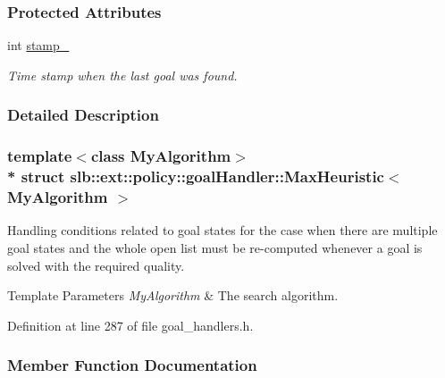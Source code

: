 \subsubsection*{Protected Attributes}
\begin{DoxyCompactItemize}
\item 
int \hyperlink{structslb_1_1ext_1_1policy_1_1goalHandler_1_1MaxHeuristic_a84086a429b193f7447166b92751b1310}{stamp\+\_\+}\hypertarget{structslb_1_1ext_1_1policy_1_1goalHandler_1_1MaxHeuristic_a84086a429b193f7447166b92751b1310}{}\label{structslb_1_1ext_1_1policy_1_1goalHandler_1_1MaxHeuristic_a84086a429b193f7447166b92751b1310}

\begin{DoxyCompactList}\small\item\em Time stamp when the last goal was found. \end{DoxyCompactList}\end{DoxyCompactItemize}


\subsubsection{Detailed Description}
\subsubsection*{template$<$class My\+Algorithm$>$\\*
struct slb\+::ext\+::policy\+::goal\+Handler\+::\+Max\+Heuristic$<$ My\+Algorithm $>$}

Handling conditions related to goal states for the case when there are multiple goal states and the whole open list must be re-\/computed whenever a goal is solved with the required quality. 


\begin{DoxyTemplParams}{Template Parameters}
{\em My\+Algorithm} & The search algorithm. \\
\hline
\end{DoxyTemplParams}


Definition at line 287 of file goal\+\_\+handlers.\+h.



\subsubsection{Member Function Documentation}
